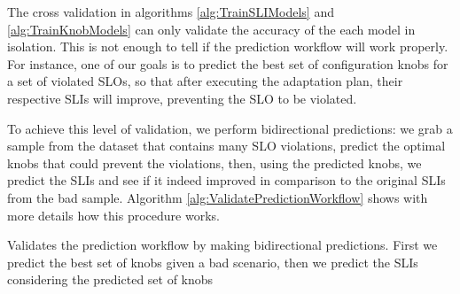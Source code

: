 The cross validation in algorithms \ref{alg:TrainSLIModels} and \ref{alg:TrainKnobModels} can only validate the accuracy of the each model in isolation. This is not enough to tell if the prediction workflow will work properly. For instance, one of our goals is to predict the best set of configuration knobs for a set of violated SLOs, so that after executing the adaptation plan, their respective SLIs will improve, preventing the SLO to be violated.

To achieve this level of validation, we perform bidirectional predictions: we grab a sample from the dataset that contains many SLO violations, predict the optimal knobs that could prevent the violations, then, using the predicted knobs, we predict the SLIs and see if it indeed improved in comparison to the original SLIs from the bad sample. Algorithm \ref{alg:ValidatePredictionWorkflow} shows with more details how this procedure works. 

\begin{algorithm}
  \SetAlgoNoLine
  \caption{Validates the prediction workflow by making bidirectional predictions. First we predict the best set of knobs given a bad scenario, then we predict the SLIs considering the predicted set of knobs}\label{alg:ValidatePredictionWorkflow}

\end{algorithm}


